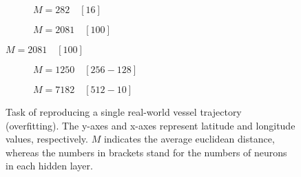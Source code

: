 \begin{figure}[H]\ContinuedFloat
     \begin{subfigure}[b]{0.48\textwidth}
         \centering
             
         \caption{$M=282 \quad [16]$}
         \label{fig:single3}
     \end{subfigure}
          \hfill
     \begin{subfigure}[b]{0.48\textwidth}
         \centering
             
         \caption{$M=2081 \quad [100]$}
     \end{subfigure}
\end{figure}
\begin{figure}[H]\ContinuedFloat
         \begin{subfigure}[b]{0.48\textwidth}
         \centering
             
         \caption{$M=1250 \quad [256-128]$}
         \label{fig:single5}
     \end{subfigure}
          \hfill
     \begin{subfigure}[b]{0.48\textwidth}
         \centering
             
         \caption{$M=7182 \quad [512-10]$}
     \end{subfigure}
     \caption{Task of reproducing a single real-world vessel trajectory (overfitting). The y-axes and x-axes represent latitude and longitude values, respectively. $M$ indicates the average euclidean distance, whereas the numbers in brackets stand for the numbers of neurons in each hidden layer.}
     \label{fig:singleTrack}
\end{figure}

